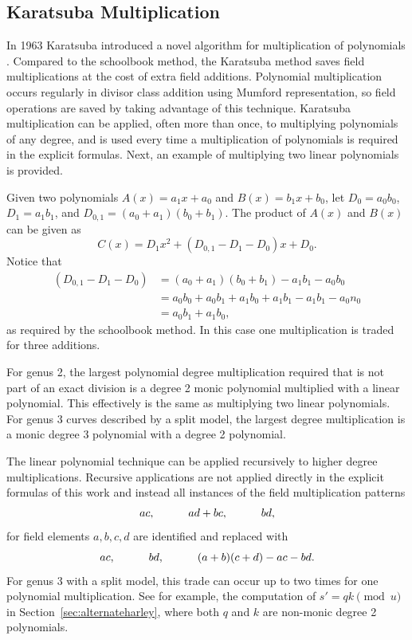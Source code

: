 \subsection{Karatsuba Multiplication} 
\label{sec:karatsubamul}
In 1963 Karatsuba introduced a novel algorithm for multiplication of polynomials
\cite{KaratsubaOfman_polymul_1963}. Compared to the schoolbook method, the
Karatsuba method saves field multiplications at the cost of extra field
additions. Polynomial multiplication occurs regularly in divisor
class addition using Mumford representation, so field operations are saved by
taking advantage of this technique. Karatsuba multiplication can be applied,
often more than once, to multiplying polynomials of any degree, and is used
every time a multiplication of polynomials is required in the explicit
formulas. Next, an example of multiplying two linear polynomials is provided.

Given two polynomials $A(x) = a_1x + a_0$ and $B(x) = b_1x + b_0$, let $D_0 =
a_0b_0$, $D_1 = a_1b_1$, and $D_{0,1} = (a_0 + a_1)(b_0 + b_1)$. The product of
$A(x)$ and $B(x)$ can be given as  $$C(x) = D_1x^2 + (D_{0,1} - D_1 - D_0)x +
D_0.$$ Notice that 
\begin{align*} (D_{0,1} - D_1 - D_0) &= (a_0 +
a_1)(b_0 + b_1) - a_1b_1 - a_0b_0\\
                      &= a_0b_0 + a_0b_1 + a_1b_0 + a_1b_1 - a_1b_1 - a_0n_0\\
                      &= a_0b_1 + a_1b_0,
\end{align*} 
as required by the schoolbook method. In this case one multiplication is traded
for three additions.

For genus 2, the largest polynomial degree multiplication required that is not
part of an exact division  is a degree 2 monic polynomial multiplied with a
linear polynomial. This effectively is the same as multiplying two linear
polynomials. For genus 3 curves described by a split model, the largest degree
multiplication is a monic degree 3 polynomial with a degree 2 polynomial. 

The linear polynomial technique can be applied recursively to higher degree
multiplications. Recursive applications are not applied directly in the explicit
formulas of this work and instead all instances of the field multiplication
patterns $$ac, \quad\quad\quad ad + bc, \quad\quad\quad bd,$$ for field elements $a,b,c,d$ are
identified and replaced with $$ ac, \quad\quad\quad bd, \quad\quad\quad (a + b)(c + d) - ac -
bd.$$ For genus 3 with a split model, this trade can occur up to two times for
one polynomial multiplication. See for example, the computation of $s' = qk
\pmod{u}$ in Section~\ref{sec:alternateharley}, where both $q$ and $k$ are
non-monic degree 2 polynomials.


